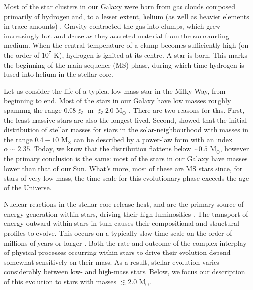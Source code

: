 Most of the star clusters in our Galaxy were born from gas clouds
composed primarily of hydrogen and, to a lesser extent, helium (as
well as heavier elements in trace amounts) \citep[e.g.][]{lada85, pringle89}.  
Gravity contracted the gas into clumps, which grew increasingly
hot and dense as they accreted material from the surrounding medium.
When the central temperature of a clump becomes sufficiently high (on
the order of $10^7$ K), hydrogen is ignited at its centre.  A star is
born.  This marks 
the beginning of the main-sequence (MS) phase, during which
time hydrogen is fused into helium in the stellar core.

Let us consider the life of a typical low-mass star in the Milky Way, from
beginning to end.  Most of the stars in our Galaxy have low
masses roughly spanning the range $0.08 \lesssim$ m $\lesssim 2.0$
M$_{\odot}$ \citep[e.g.][]{kroupa02a}.  There are two reasons for this.
First, the
least massive stars are also the longest lived.  Second, 
\citet{salpeter55} showed that the initial distribution of
stellar masses for stars in the solar-neighbourhood with masses in the
range $0.4 - 10$ M$_{\odot}$ can be described
by a power-law form with an index $\alpha \sim 2.35$.  Today, we know
that the distribution flattens below $\sim 0.5$ M$_{\odot}$, however
the primary conclusion is the same:  most of the stars in our Galaxy
have masses lower than that of our Sun.  What's more, most of these
are MS stars since, for stars of very low-mass, the time-scale for this
evolutionary phase exceeds the age of the Universe.  

Nuclear reactions in the stellar core release heat, and are the
primary source of energy generation within stars, driving their high
luminosities \citep[e.g.][]{clayton68}.  The transport of energy
outward within stars in turn 
causes their compositional and structural profiles to evolve.  This
occurs on a typically slow time-scale on the order of millions of
years or longer \citep[e.g.][]{kippenhahn90, maeder09}.  Both the rate
and outcome of the complex interplay of physical processes occurring
within stars to drive their evolution depend somewhat sensitively on
their mass.  As a 
result, stellar evolution varies considerably between low- and
high-mass stars.  Below, we focus our description of this evolution to
stars with masses $\lesssim 2.0$ M$_{\odot}$.

